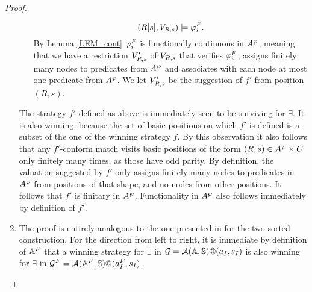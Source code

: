 \begin{proof}
\begin{enumerate}
\begin{enumerate}[label=(\alph*),ref=\alph*]
             $$(R[s], V_{R,s}) \models \varphi_i^{F}.$$
             By Lemma \ref{LEM_cont} $\varphi_i^{F}$ is functionally continuous in $A^{\wp}$, meaning that we have a restriction $V_{R,s}'$ of $V_{R,s}$ that verifies $\varphi_i^{F}$, assigns finitely many nodes to predicates from $A^{\wp}$ and associates with each node at most one predicate from $A^{\wp}$. We let $V_{R,s}'$ be the suggestion of $f'$ from position $(R,s)$.
      \end{enumerate}
      The strategy $f'$ defined as above is immediately seen to be
      surviving for $\exists$. It is also winning, because the set of
      basic positions on which $f'$ is defined is a subset of the one
      of the winning strategy $f$. By this observation it also follows that any $f'$-conform match visits basic positions of the form $(R,s) \in A^{\wp} \times C$ only finitely many times, as those have odd parity. By definition, the valuation suggested by $f'$ only assigns finitely many nodes to predicates in $A^{\wp}$ from positions of that shape, and no nodes from other positions. It follows that $f'$ is finitary in $A^{\wp}$. Functionality in $A^{\wp}$ also follows immediately by definition of $f'$.
  \item The proof is entirely analogous to the one presented in \cite[Prop. 3.9]{Zanasi:Thesis:2012} for the two-sorted construction. For the direction from left to right, it is immediate by definition of $\mathbb{A}^{F}$ that a winning strategy for $\exists$ in $\mathcal{G} = \mathcal{A}(\mathbb{A},\mathbb{S})@(a_I,s_I)$ is also winning for $\exists$ in $\mathcal{G}^{F} = \mathcal{A}(\mathbb{A}^{F},\mathbb{S})@(a_I^{F},s_I)$.


\end{enumerate}
\end{proof}
